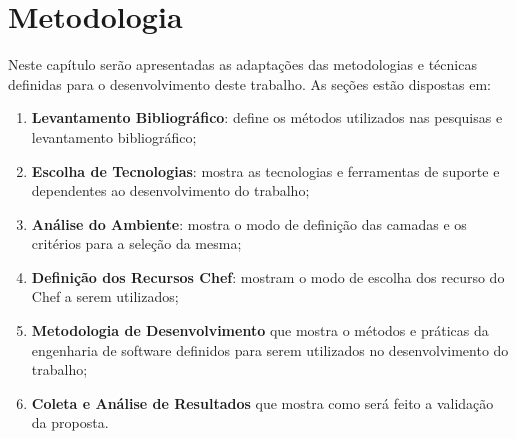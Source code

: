 \chapter{Metodologia}
\label{chap:metod}

Neste capítulo serão apresentadas as adaptações das metodologias e técnicas
definidas para o desenvolvimento deste trabalho. As seções estão dispostas
em:

\begin{enumerate}
  \item \textbf{Levantamento Bibliográfico}: define os métodos utilizados nas
    pesquisas e levantamento bibliográfico;
  \item \textbf{Escolha de Tecnologias}: mostra as tecnologias e
    ferramentas de suporte e dependentes ao desenvolvimento do trabalho;
  \item \textbf{Análise do Ambiente}: mostra o modo de definição das camadas e os critérios para
    a seleção da mesma;
  \item \textbf{Definição dos Recursos Chef}: mostram o modo de escolha dos recurso do Chef a serem utilizados;
  \item \textbf{Metodologia de Desenvolvimento} que mostra o métodos e práticas da engenharia de software
    definidos para serem utilizados no desenvolvimento do trabalho;
  \item \textbf{Coleta e Análise de Resultados} que mostra como será feito a validação da proposta.
\end{enumerate}








